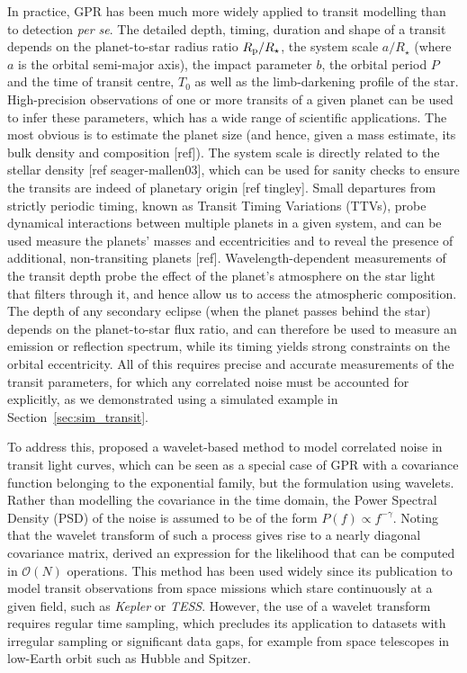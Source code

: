 \documentclass[letterpaper]{ar-1col}
\begin{document}
In practice, GPR has been much more widely applied to transit modelling than to detection \textit{per se}. The detailed depth, timing, duration and shape of a transit depends on the planet-to-star radius ratio $R_{\rm p}/R_\star$, the system scale $a/R_\star$ (where $a$ is the orbital semi-major axis), the impact parameter $b$, the orbital period $P$ and the time of transit centre, $T_0$ as well as the limb-darkening profile of the star. High-precision observations of one or more transits of a given planet can be used to infer these parameters, which has a wide range of scientific applications. The most obvious is to estimate the planet size (and hence, given a mass estimate, its bulk density and composition [ref]). The system scale is directly related to the stellar density [ref seager-mallen03], which can be used for sanity checks to ensure the transits are indeed of planetary origin [ref tingley]. Small departures from strictly periodic timing, known as Transit Timing Variations (TTVs), probe dynamical interactions between multiple planets in a given system, and can be used measure the planets' masses and eccentricities and to reveal the presence of additional, non-transiting planets [ref]. Wavelength-dependent measurements of the transit depth probe the effect of the planet's atmosphere on the star light that filters through it, and hence allow us to access the atmospheric composition. The depth of any secondary eclipse (when the planet passes behind the star) depends on the planet-to-star flux ratio, and can therefore be used to measure an emission or reflection spectrum, while its timing yields strong constraints on the orbital eccentricity. All of this requires precise and accurate measurements of the transit parameters, for which any correlated noise must be accounted for explicitly, as we demonstrated using a simulated example in Section~\ref{sec:sim_transit}.


To address this, \citet{2009ApJ...704...51C} proposed a wavelet-based method to model correlated noise in transit light curves, which can be seen as a special case of GPR with a covariance function belonging to the exponential family, but the formulation using wavelets. Rather than modelling the covariance in the time domain, the Power Spectral Density (PSD) of the noise is assumed to be of the form $P(f) \propto f^{-\gamma}$.
Noting that the wavelet transform of such a process gives rise to a nearly diagonal covariance matrix, \citet{2009ApJ...704...51C}  derived an expression for the likelihood that can be computed in $\mathcal{O}(N)$ operations. This method has been used widely since its publication to model transit observations from space missions which stare continuously at a given field, such as \textit{Kepler} or \textit{TESS}. However, the use of a wavelet transform requires regular time sampling, which precludes its application to datasets with irregular sampling or significant data gaps, for example from space telescopes in low-Earth orbit such as Hubble and Spitzer.
\begin{armarginnote}
\end{armarginnote}
\end{document}
